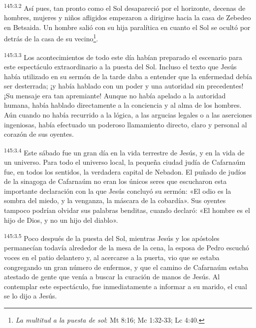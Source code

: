 \par 
\textsuperscript{145:3.2} Así pues, tan pronto como el Sol desapareció por el horizonte, decenas de hombres, mujeres y niños afligidos empezaron a dirigirse hacia la casa de Zebedeo en Betsaida. Un hombre salió con su hija paralítica en cuanto el Sol se ocultó por detrás de la casa de su vecino\footnote{\textit{La multitud a la puesta de sol}: Mt 8:16; Mc 1:32-33; Lc 4:40.}.

\par 
\textsuperscript{145:3.3} Los acontecimientos de todo este día habían preparado el escenario para este espectáculo extraordinario a la puesta del Sol. Incluso el texto que Jesús había utilizado en su sermón de la tarde daba a entender que la enfermedad debía ser desterrada; ¡y había hablado con un poder y una autoridad sin precedentes! ¡Su mensaje era tan apremiante! Aunque no había apelado a la autoridad humana, había hablado directamente a la conciencia y al alma de los hombres. Aún cuando no había recurrido a la lógica, a las argucias legales o a las aserciones ingeniosas, había efectuado un poderoso llamamiento directo, claro y personal al corazón de sus oyentes.

\par 
\textsuperscript{145:3.4} Este sábado fue un gran día en la vida terrestre de Jesús, y en la vida de un universo. Para todo el universo local, la pequeña ciudad judía de Cafarnaúm fue, en todos los sentidos, la verdadera capital de Nebadon. El puñado de judíos de la sinagoga de Cafarnaúm no eran los únicos seres que escucharon esta importante declaración con la que Jesús concluyó su sermón: «El odio es la sombra del miedo, y la venganza, la máscara de la cobardía». Sus oyentes tampoco podrían olvidar sus palabras benditas, cuando declaró: «El hombre es el hijo de Dios, y no un hijo del diablo».

\par 
\textsuperscript{145:3.5} Poco después de la puesta del Sol, mientras Jesús y los apóstoles permanecían todavía alrededor de la mesa de la cena, la esposa de Pedro escuchó voces en el patio delantero y, al acercarse a la puerta, vio que se estaba congregando un gran número de enfermos, y que el camino de Cafarnaúm estaba atestado de gente que venía a buscar la curación de manos de Jesús. Al contemplar este espectáculo, fue inmediatamente a informar a su marido, el cual se lo dijo a Jesús.

